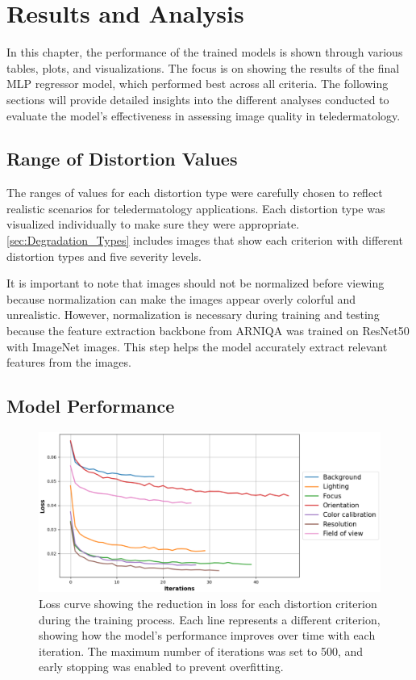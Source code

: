 \chapter{Results and Analysis}
\label{ch:ResultsAnalysis}
In this chapter, the performance of the trained models is shown through various tables, plots, and visualizations. The focus is on showing the results of the final MLP regressor model, which performed best across all criteria. The following sections will provide detailed insights into the different analyses conducted to evaluate the model’s effectiveness in assessing image quality in teledermatology.\par

\section{Range of Distortion Values}
\label{sec:RangeDistortionValues}
The ranges of values for each distortion type were carefully chosen to reflect realistic scenarios for teledermatology  applications. Each distortion type was visualized individually to make sure they were appropriate. \autoref{sec:Degradation_Types} includes images that show each criterion with different distortion types and five severity levels. \par
\vspace{\baselineskip}
\noindent
It is important to note that images should not be normalized before viewing because normalization can make the images appear overly colorful and unrealistic. However, normalization is necessary during training and testing because the feature extraction backbone from ARNIQA was trained on ResNet50 with ImageNet images. This step helps the model accurately extract relevant features from the images. \par %
\section{Model Performance}
\label{sec:ModelPerformance}
\begin{figure}[ht]
    \centering
    \includegraphics[keepaspectratio,width=15cm]{img/loss.png}
    \caption{Loss curve showing the reduction in loss for each distortion criterion during the training process. Each line represents a different criterion, showing how the model’s performance improves over time with each iteration. The maximum number of iterations was set to 500, and early stopping was enabled to prevent overfitting.}
    \label{fig:loss}
\end{figure}

